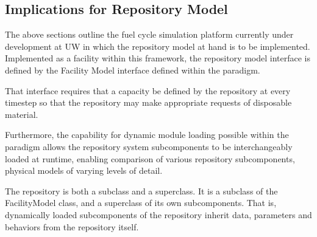 \subsection{Implications for Repository Model}

The above sections outline the fuel cycle simulation platform
currently under development at \gls{UW} in which the repository model
at hand is to be implemented.  Implemented as a facility within this 
framework, the repository model interface is defined by the Facility
Model interface defined within the \Cyclus paradigm. 

That interface requires that a capacity be defined by the repository at every 
\Cyclus timestep so that the repository may make appropriate requests of 
disposable material.

Furthermore, the capability for dynamic module loading possible within 
the \Cyclus paradigm allows the repository system subcomponents to be 
interchangeably loaded at runtime, enabling comparison of various 
repository subcomponents, physical models of varying levels of detail. 

The repository is both a subclass and a superclass. It is a subclass of the 
FacilityModel class, and a superclass of its own subcomponents. That is, 
dynamically loaded subcomponents of the repository inherit data, parameters and 
behaviors from the repository itself. 




